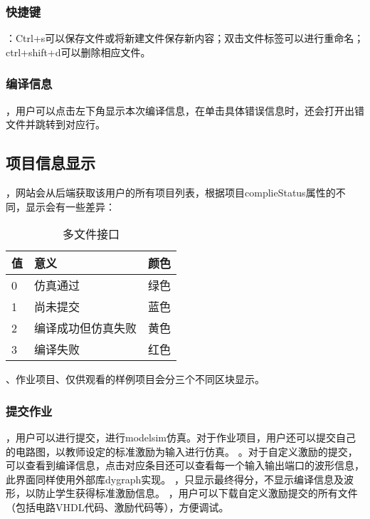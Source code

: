 \documentclass{article}
\begin{document}
\begin{CJK}{UTF8}{gbsn}
\subsubsection{快捷键}
    ：Ctrl+s可以保存文件或将新建文件保存新内容；双击文件标签可以进行重命名；ctrl+shift+d可以删除相应文件。

\subsubsection{编译信息}
    ，用户可以点击左下角显示本次编译信息，在单击具体错误信息时，还会打开出错文件并跳转到对应行。


\subsection{项目信息显示}
    ，网站会从后端获取该用户的所有项目列表，根据项目complieStatus属性的不同，显示会有一些差异：
    \begin{table}[!h]
    \begin{tabular}{|l|l|l|}
    \hline
    值 & 意义 & 颜色  \\
    \hline
    0 & 仿真通过 & 绿色 \\
    \hline
    1 & 尚未提交 & 蓝色 \\
    \hline
    2 & 编译成功但仿真失败 & 黄色 \\
    \hline
    3 & 编译失败 & 红色 \\
    \hline
    \end{tabular}
    \caption{多文件接口}
    \end{table}
    、作业项目、仅供观看的样例项目会分三个不同区块显示。

\subsubsection{提交作业}
    ，用户可以进行提交，进行modelsim仿真。对于作业项目，用户还可以提交自己的电路图，以教师设定的标准激励为输入进行仿真。
    。对于自定义激励的提交，可以查看到编译信息，点击对应条目还可以查看每一个输入输出端口的波形信息，此界面同样使用外部库dygraph实现。
    ，只显示最终得分，不显示编译信息及波形，以防止学生获得标准激励信息。
    ，用户可以下载自定义激励提交的所有文件（包括电路VHDL代码、激励代码等），方便调试。

\end{CJK}
\end{document}
